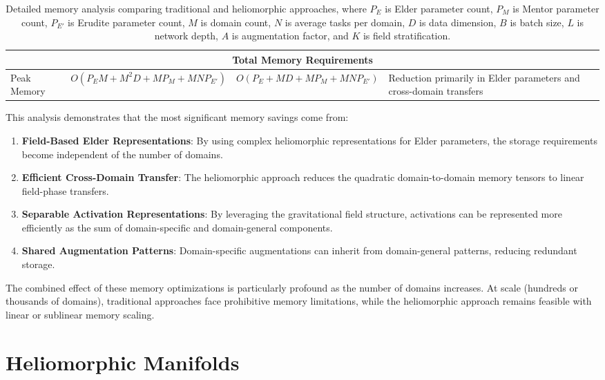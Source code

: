 \begin{table}[h]
\begin{tabular}{|p{3.5cm}|p{3.5cm}|p{3.5cm}|p{3.5cm}|}
\hline
\multicolumn{4}{|c|}{\textbf{Total Memory Requirements}} \\
\hline
Peak Memory & $O(P_E M + M^2 D + MP_M + MNP_{E'})$ & $O(P_E + MD + MP_M + MNP_{E'})$ & Reduction primarily in Elder parameters and cross-domain transfers \\
\hline
\end{tabular}
\caption{Detailed memory analysis comparing traditional and heliomorphic approaches, where $P_E$ is Elder parameter count, $P_M$ is Mentor parameter count, $P_{E'}$ is Erudite parameter count, $M$ is domain count, $N$ is average tasks per domain, $D$ is data dimension, $B$ is batch size, $L$ is network depth, $A$ is augmentation factor, and $K$ is field stratification.}
\label{tab:memory_analysis}
\end{table}

This analysis demonstrates that the most significant memory savings come from:

\begin{enumerate}
    \item \textbf{Field-Based Elder Representations}: By using complex heliomorphic representations for Elder parameters, the storage requirements become independent of the number of domains.
    
    \item \textbf{Efficient Cross-Domain Transfer}: The heliomorphic approach reduces the quadratic domain-to-domain memory tensors to linear field-phase transfers.
    
    \item \textbf{Separable Activation Representations}: By leveraging the gravitational field structure, activations can be represented more efficiently as the sum of domain-specific and domain-general components.
    
    \item \textbf{Shared Augmentation Patterns}: Domain-specific augmentations can inherit from domain-general patterns, reducing redundant storage.
\end{enumerate}

The combined effect of these memory optimizations is particularly profound as the number of domains increases. At scale (hundreds or thousands of domains), traditional approaches face prohibitive memory limitations, while the heliomorphic approach remains feasible with linear or sublinear memory scaling.

\section{Heliomorphic Manifolds}

